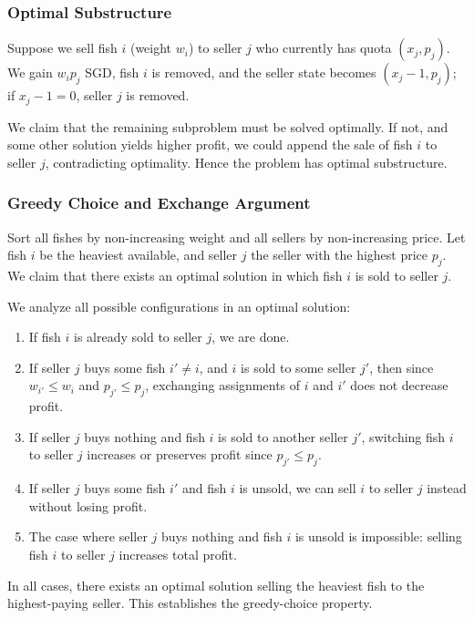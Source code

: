 \documentclass[9pt]{extarticle}
\begin{document}
\subsubsection*{Optimal Substructure}
Suppose we sell fish \(i\) (weight \(w_i\)) to seller \(j\) who currently has quota
\((x_j, p_j)\). We gain \(w_i p_j\) SGD, fish \(i\) is removed, and the seller state
becomes \((x_j - 1, p_j)\); if \(x_j - 1 = 0\), seller \(j\) is removed.

We claim that the remaining subproblem must be solved optimally. If not, and some
other solution yields higher profit, we could append the sale of fish \(i\) to
seller \(j\), contradicting optimality. Hence the problem has optimal substructure.

\subsubsection*{Greedy Choice and Exchange Argument}
Sort all fishes by non-increasing weight and all sellers by non-increasing price.
Let fish \(i\) be the heaviest available, and seller \(j\) the seller with the
highest price \(p_j\). We claim that there exists an optimal solution in which
fish \(i\) is sold to seller \(j\).

We analyze all possible configurations in an optimal solution:
\begin{enumerate}
    \item If fish \(i\) is already sold to seller \(j\), we are done.
    \item If seller \(j\) buys some fish \(i' \neq i\), and \(i\) is sold to some
          seller \(j'\), then since \(w_{i'} \le w_i\) and \(p_{j'} \le p_j\),
          exchanging assignments of \(i\) and \(i'\) does not decrease profit.
    \item If seller \(j\) buys nothing and fish \(i\) is sold to another seller \(j'\),
          switching fish \(i\) to seller \(j\) increases or preserves profit since
          \(p_{j'} \le p_j\).
    \item If seller \(j\) buys some fish \(i'\) and fish \(i\) is unsold, we can sell
          \(i\) to seller \(j\) instead without losing profit.
    \item The case where seller \(j\) buys nothing and fish \(i\) is unsold is impossible:
          selling fish \(i\) to seller \(j\) increases total profit.
\end{enumerate}
In all cases, there exists an optimal solution selling the heaviest fish to the
highest-paying seller. This establishes the greedy-choice property.
\end{document}
